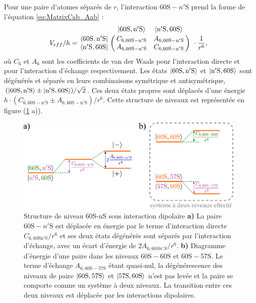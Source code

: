 Pour une paire d'atomes séparés de $r$, l'interaction $\mathrm{60S}-n'\mathrm{S}$ prend la forme de l'équation \eqref{eq:MatrixCab_Aab} :
\begin{equation}
\label{eq:Matrix_60SnS}
V_{eff}/h = \bordermatrix{~ 	&\ket{\mathrm{60S,n'S}} 	& \ket{\mathrm{n'S,60S}} \cr
	\bra{\mathrm{60S,n'S}}		&C_{6,\mathrm{60S-n'S}}		&A_{6,\mathrm{60S-n'S}}	\cr 
	\bra{\mathrm{n'S,60S}} 		&A_{6,\mathrm{60S-n'S}}		&C_{6,\mathrm{60S-n'S}} \cr} \ \cdot \frac{1}{r^6},
\end{equation}
%
où $C_6$ et $A_6$ sont les coefficients de van der Waals pour l'interaction directe et pour l'interaction d'échange respectivement.
Les états $\ket{\mathrm{60S,n'S}}$ et $\ket{\mathrm{n'S,60S}}$ sont dégénérés et séparés en leurs combinaisons symétrique et antisymétrique, $(\ket{\mathrm{60S,n'S}}\pm\ket{\mathrm{n'S,60S}})/\sqrt{2}$.
Ces deux états propres sont déplacés d'une énergie $h\cdot (C_{6,\mathrm{60S-n'S}} \pm A_{6,\mathrm{60S-n'S}}) / r^6$.
Cette structure de niveaux est représentée en figure (\ref{fig:60S-nS} a)).
%
\begin{figure}[h]
\centering
\includegraphics[width=\linewidth]{figures/low_l/60S-nS}
\caption[Structure de niveau 60S-nS sous interaction dipolaire]{
Structure de niveau 60S-nS sous interaction dipolaire
\textbf{a)} La paire $\mathrm{60S}-n'\mathrm{S}$ est déplacée en énergie par le terme d'interaction directe $C_{6,\mathrm{60Sn'S}}/r^6$ et ses deux états dégénérés sont séparés par l'interaction d'échange, avec un écart d'énergie de $2A_{6,60Sn'S}/r^6$.
\textbf{b)} Diagramme d'énergie d'une paire dans les niveaux $\mathrm{60S-60S}$ et $\mathrm{60S-57S}$.
Le terme d'échange $A_{6,\mathrm{60S-57S}}$ étant quasi-nul, la dégénérescence des niveaux de paire $\ket{\mathrm{60S,57S}}$ et $\ket{\mathrm{57S,60S}}$ n'est pas levée et la paire se comporte comme un système à deux niveaux.
La transition entre ces deux niveaux est déplacée par les interactions dipolaires.
}
\label{fig:60S-nS}
\end{figure}
